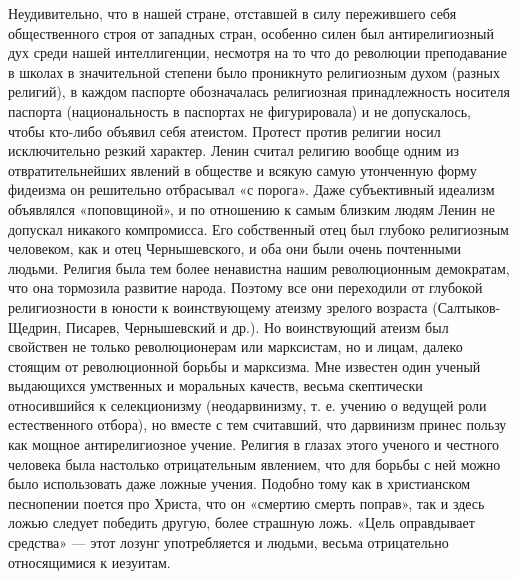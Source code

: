 Неудивительно, что в нашей стране, отставшей в силу пережившего себя
общественного строя от западных стран, особенно силен был антирелигиозный дух
среди нашей интеллигенции, несмотря на то что до революции преподавание в
школах в значительной степени было проникнуто религиозным духом (разных
религий), в каждом паспорте обозначалась религиозная принадлежность носителя
паспорта (национальность в паспортах не фигурировала) и не допускалось, чтобы
кто-либо объявил себя атеистом. Протест против религии носил исключительно
резкий характер. Ленин считал религию вообще одним из отвратительнейших явлений
в обществе и всякую самую утонченную форму фидеизма он решительно отбрасывал «с
порога». Даже субъективный идеализм объявлялся «поповщиной», и по отношению к
самым близким людям Ленин не допускал никакого компромисса. Его собственный
отец был глубоко религиозным человеком, как и отец Чернышевского, и оба они
были очень почтенными людьми. Религия была тем более ненавистна нашим
революционным демократам, что она тормозила развитие народа. Поэтому все они
переходили от глубокой религиозности в юности к воинствующему атеизму зрелого
возраста (Салтыков-Щедрин, Писарев, Чернышевский и др.). Но воинствующий атеизм
был свойствен не только революционерам или марксистам, но и лицам, далеко
стоящим от революционной борьбы и марксизма. Мне известен один ученый
выдающихся умственных и моральных качеств, весьма скептически относившийся к
селекционизму (неодарвинизму, т. е. учению о ведущей роли естественного
отбора), но вместе с тем считавший, что дарвинизм принес пользу как мощное
антирелигиозное учение. Религия в глазах этого ученого и честного человека была
настолько отрицательным явлением, что для борьбы с ней можно было использовать
даже ложные учения. Подобно тому как в христианском песнопении поется про
Христа, что он «смертию смерть поправ», так и здесь ложью следует победить
другую, более страшную ложь. «Цель оправдывает средства» --- этот лозунг
употребляется и людьми, весьма отрицательно относящимися к иезуитам.

